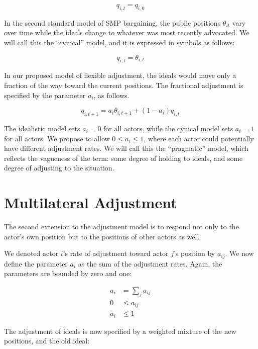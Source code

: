 \documentclass[a4paper,10pt]{article}
\begin{document}
\begin{equation}
q_{i,t} = q_{i,0}
\end{equation}


In the second standard model of SMP bargaining, the public positions $\theta_{it}$ vary over time
while the ideals change to whatever was most recently advocated. We will call this the ``cynical'' model,
and it is expressed in symbols as follows:

\begin{equation}
q_{i,t} = \theta_{i,t}
\end{equation}

In our proposed model of flexible adjustment, the ideals would move only a fraction of the way
toward the current positions. The fractional adjustment is specified by the parameter $a_i$, as follows.

\begin{equation}
 q_{i,t+1} =  a_i  \theta_{i,t+1}  + (1-a_i) q_{i,t}
\end{equation}

The idealistic model sets $a_i = 0$ for all actors, while the cynical model sets $a_i = 1$ for all actors.
We propose to allow $0 \le a_i \le 1$, where each actor could potentially have different adjustment rates.
We will call this the ``pragmatic'' model, which reflects the vagueness of the term: some degree of holding
to ideals, and some degree of adjusting to the situation.


\section{Multilateral Adjustment}

The second extension to the adjustment model is to respond not only to the actor's own position
but to the positions of other actors as well.

We denoted actor $i$'s rate of adjustment toward actor $j$'s position by $a_{ij}$. We now define the
parameter $a_i$ as the sum of the adjustment rates. Again, the parameters are bounded by zero and one: 

\begin{align}
   a_i   & = \sum_{j} a_{ij}\\
    0    & \le a_{ij}\\
   a_i   & \le 1
\end{align} 

The adjustment of ideals is now specified by a weighted mixture of the new positions, and the old ideal:
\end{document}
